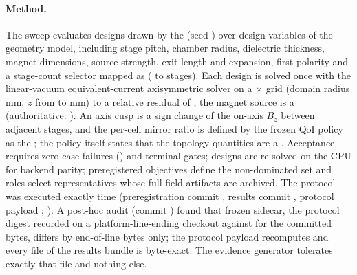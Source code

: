 \paragraph{Method.}
The sweep evaluates \SwpEvaluated{} designs drawn by the \SwpSamplingAlgorithm{}
(seed \SwpSeed) over \SwpDesignVariableCount{} design variables of the geometry
model, including stage pitch, chamber radius, dielectric thickness, magnet
dimensions, source strength, exit length and expansion, first polarity and a
stage-count selector mapped as \texttt{\SwpStageMapping} (\SwpStageMin{} to
\SwpStageMax{} stages). Each design is solved once with the linear-vacuum
\SwpModelLevel{} equivalent-current axisymmetric solver on a
\SwpGridRadial$\times$\SwpGridAxial{} grid (domain radius \SwpDomainRadiusMm{} mm,
$z$ from \SwpDomainZMinMm{} to \SwpDomainZMaxMm{} mm) to a relative residual of
\SwpSolverRelTol; the magnet source is a \SwpPreviewDescription{} (authoritative:
\SwpPreviewAuthoritative). An axis cusp is a sign change of the on-axis $B_z$
between adjacent stages, and the per-cell mirror ratio is defined by the frozen
QoI policy as the \SwpMirrorRatioDefinition; the policy itself states that the
topology quantities are a \SwpTopologyClaim. Acceptance requires zero case
failures (\SwpZeroFailuresRequired) and \SwpGateCount{} terminal gates; \SwpParityCaseCount{}
designs are re-solved on the CPU for backend parity; \SwpObjectiveCount{}
preregistered objectives define the non-dominated set and \SwpRoleCount{} roles
select representatives whose full field artifacts are archived. The protocol was
executed exactly \SwpMaxExecutions{} time (preregistration commit
\texttt{\SwpPreregCommit}, results commit \texttt{\SwpResultsCommit}, protocol
payload \texttt{\SwpProtocolPayloadSha}; \SwpTimingPolicy). A post-hoc audit
(commit \texttt{\SwpAuditCommit}) found that \SwpToleratedEolFiles{} frozen
sidecar, the protocol digest \texttt{\SwpProtocolRecordedSha} recorded on a
platform-line-ending checkout against \texttt{\SwpProtocolLfSha} for the
committed bytes, differs by end-of-line bytes only; the protocol payload
recomputes and every file of the results bundle is byte-exact. The evidence
generator tolerates exactly that file and nothing else.

